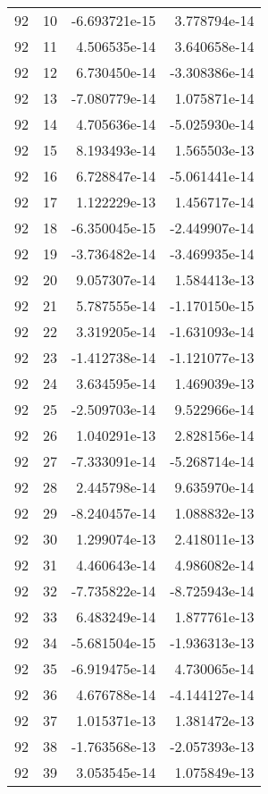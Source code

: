 \begin{tabular}{rrrr}
  92 &   10 & -6.693721e-15 &  3.778794e-14 \\
  92 &   11 &  4.506535e-14 &  3.640658e-14 \\
  92 &   12 &  6.730450e-14 & -3.308386e-14 \\
  92 &   13 & -7.080779e-14 &  1.075871e-14 \\
  92 &   14 &  4.705636e-14 & -5.025930e-14 \\
  92 &   15 &  8.193493e-14 &  1.565503e-13 \\
  92 &   16 &  6.728847e-14 & -5.061441e-14 \\
  92 &   17 &  1.122229e-13 &  1.456717e-14 \\
  92 &   18 & -6.350045e-15 & -2.449907e-14 \\
  92 &   19 & -3.736482e-14 & -3.469935e-14 \\
  92 &   20 &  9.057307e-14 &  1.584413e-13 \\
  92 &   21 &  5.787555e-14 & -1.170150e-15 \\
  92 &   22 &  3.319205e-14 & -1.631093e-14 \\
  92 &   23 & -1.412738e-14 & -1.121077e-13 \\
  92 &   24 &  3.634595e-14 &  1.469039e-13 \\
  92 &   25 & -2.509703e-14 &  9.522966e-14 \\
  92 &   26 &  1.040291e-13 &  2.828156e-14 \\
  92 &   27 & -7.333091e-14 & -5.268714e-14 \\
  92 &   28 &  2.445798e-14 &  9.635970e-14 \\
  92 &   29 & -8.240457e-14 &  1.088832e-13 \\
  92 &   30 &  1.299074e-13 &  2.418011e-13 \\
  92 &   31 &  4.460643e-14 &  4.986082e-14 \\
  92 &   32 & -7.735822e-14 & -8.725943e-14 \\
  92 &   33 &  6.483249e-14 &  1.877761e-13 \\
  92 &   34 & -5.681504e-15 & -1.936313e-13 \\
  92 &   35 & -6.919475e-14 &  4.730065e-14 \\
  92 &   36 &  4.676788e-14 & -4.144127e-14 \\
  92 &   37 &  1.015371e-13 &  1.381472e-13 \\
  92 &   38 & -1.763568e-13 & -2.057393e-13 \\
  92 &   39 &  3.053545e-14 &  1.075849e-13 \\

\end{tabular}
